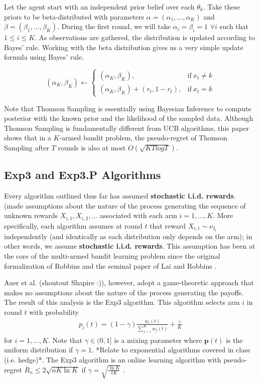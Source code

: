 \documentclass[12pt]{article}
\begin{document}
Let the agent start with an independent prior belief over each $\theta_k$. Take these priors to be beta-distributed  with parameters $\alpha = (\alpha_1, ..., \alpha_K)$ and $\beta = (\beta_1, ..., \beta_K)$. During the first round, we will take $\alpha_i = \beta_i = 1$ $\forall i$ such that $1 \leq i \leq K$. As observations are gathered, the distribution is updated according to Bayes' rule. Working with the beta distribution gives us a very simple update formula using Bayes' rule. 

\begin{equation}
  (\alpha_K, \beta_K) \leftarrow
    \begin{cases}
      (\alpha_K, \beta_K), & \text{if}\ x_t \neq k \\
      (\alpha_K, \beta_K) + (r_t,1-r_t), & \text{if}\ x_t = k
    \end{cases}
 \end{equation}
 
 Note that Thomson Sampling is essentially using Bayesian Inference to compute posterior with the known prior and the likelihood of the sampled data. Although Thomson Sampling is fundamentally different from UCB algorithms, this paper\cite{ThomsonSamplingRegret} shows that in a $K$-armed bandit problem, the pseudo-regret of Thomson Sampling after $T$ rounds is also at most $O(\sqrt{KTlogT})$.

\subsection{Exp3 and Exp3.P Algorithms}

Every algorithm outlined thus far has assumed \textbf{stochastic i.i.d. rewards}. (made assumptions about the nature of the process generating the sequence of unknown rewards $X_{i,1},X_{i,2},...$ associated with each arm $i=1,...,K$. More specifically, each algorithm assumes at round $t$ that reward $X_{i,t}\sim\nu_{I_{t}}$ independently (and identically as each distribution only depends on the arm); in other words, we assume \textbf{stochastic i.i.d. rewards}. This assumption has been at the core of the multi-armed bandit learning problem since the original formalization of Robbins \cite{robbins} and the seminal paper of Lai and Robbins \cite{lai}.

Auer et al. \cite{ThomsonTutorial} (shoutout Shapire :)), however, adopt a game-theoretic approach that makes no assumptions about the nature of the process generating the payoffs. The result of this analysis is the Exp3 algorithm. This algorithm selects arm $i$ in round $t$ with probability
\begin{align*}
p_{i}(t)=(1-\gamma)\frac{w_{i}(t)}{\sum_{j=1}^{K}w_{j}(t)}+\frac{\gamma}{K}
\end{align*}
for $i=1,...,K$. Note that $\gamma\in(0,1]$ is a mixing parameter where $\boldsymbol{p}(t)$ is the uniform distribution if $\gamma=1$. *Relate to exponential algorithms covered in class (i.e. hedge)*. The Exp3 algorithm is an online learning algorithm with pseudo-regret $\bar{R}_{n}\leq2\sqrt{nK\ln K}$ if $\gamma=\sqrt{\frac{\ln K}{tK}}$ \cite{bubeck2012}. 
\end{document}
